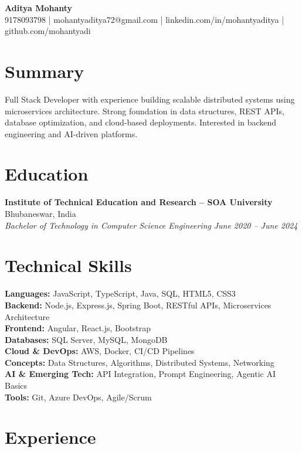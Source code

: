\documentclass[letterpaper,10.5pt]{article}
\newcommand{\resumeSubheading}[4]{
  \vspace{-2pt}
  \textbf{#1} \hfill #2 \\
  \textit{\small #3} \hfill \textit{\small #4}
}
\begin{document}
\begin{center}
{\LARGE \textbf{Aditya Mohanty}} \\
9178093798 \quad | \quad mohantyaditya72@gmail.com \quad | \quad
linkedin.com/in/mohantyaditya \quad | \quad github.com/mohantyadi
\end{center}

\section*{Summary}
Full Stack Developer with experience building scalable distributed systems using microservices architecture. Strong foundation in data structures, REST APIs, database optimization, and cloud-based deployments. Interested in backend engineering and AI-driven platforms.

\section*{Education}
\resumeSubheading
{Institute of Technical Education and Research -- SOA University}{Bhubaneswar, India}
{Bachelor of Technology in Computer Science Engineering}{June 2020 -- June 2024}

\section*{Technical Skills}
\small{
\textbf{Languages:} JavaScript, TypeScript, Java, SQL, HTML5, CSS3 \\
\textbf{Backend:} Node.js, Express.js, Spring Boot, RESTful APIs, Microservices Architecture \\
\textbf{Frontend:} Angular, React.js, Bootstrap \\
\textbf{Databases:} SQL Server, MySQL, MongoDB \\
\textbf{Cloud \& DevOps:} AWS, Docker, CI/CD Pipelines \\
\textbf{Concepts:} Data Structures, Algorithms, Distributed Systems, Networking \\
\textbf{AI \& Emerging Tech:} API Integration, Prompt Engineering, Agentic AI Basics \\
\textbf{Tools:} Git, Azure DevOps, Agile/Scrum
}

\section*{Experience}
\end{document}
